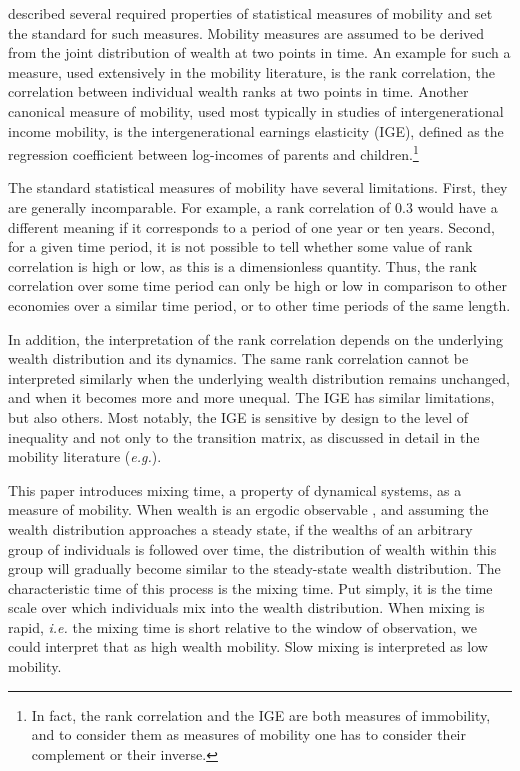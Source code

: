 \documentclass[11pt]{article}
\newcommand{\ie}{{\it i.e.}\xspace}
\newcommand{\eg}{{\it e.g.}\xspace}
\numberwithin{equation}{section}
\begin{document}
\citet{Shorrocks1978} described several required properties of statistical measures of mobility and set the standard for such measures. Mobility measures are assumed to be derived from the joint distribution of wealth at two points in time.
An example for such a measure, used extensively in the mobility literature, is the rank correlation, the correlation between individual wealth ranks at two points in time. Another canonical measure of mobility, used most typically in studies of intergenerational income mobility, is the intergenerational earnings elasticity (IGE), defined as the regression coefficient between log-incomes of parents and children.\footnote{In fact, the rank correlation and the IGE are both measures of immobility, and to consider them as measures of mobility one has to consider their complement or their inverse.}

The standard statistical measures of mobility have several limitations. First, they are generally incomparable. For example, a rank correlation of 0.3 would have a different meaning if it corresponds to a period of one year or ten years. Second, for a given time period, it is not possible to tell whether some value of rank correlation is high or low, as this is a dimensionless quantity. Thus, the rank correlation over some time period can only be high or low in comparison to other economies over a similar time period, or to other time periods of the same length.

In addition, the interpretation of the rank correlation depends on the underlying wealth distribution and its dynamics. The same rank correlation cannot be interpreted similarly when the underlying wealth distribution remains unchanged, and when it becomes more and more unequal. The IGE has similar limitations, but also others. Most notably, the IGE is sensitive by design to the level of inequality and not only to the transition matrix, as discussed in detail in the mobility literature (\eg \citet{chettyETAL2014}).

This paper introduces mixing time, a property of dynamical systems, as a measure of mobility. When wealth is an ergodic observable \citep{PetersAdamou2018c}, and assuming the wealth distribution approaches a steady state, if the wealths of an arbitrary group of individuals is followed over time, the distribution of wealth within this group will gradually become similar to the steady-state wealth distribution. The characteristic time of this process is the mixing time. Put simply, it is the time scale over which individuals mix into the wealth distribution. When mixing is rapid, \ie the mixing time is short relative to the window of observation, we could interpret that as high wealth mobility. Slow mixing is interpreted as low mobility.
\end{document}
